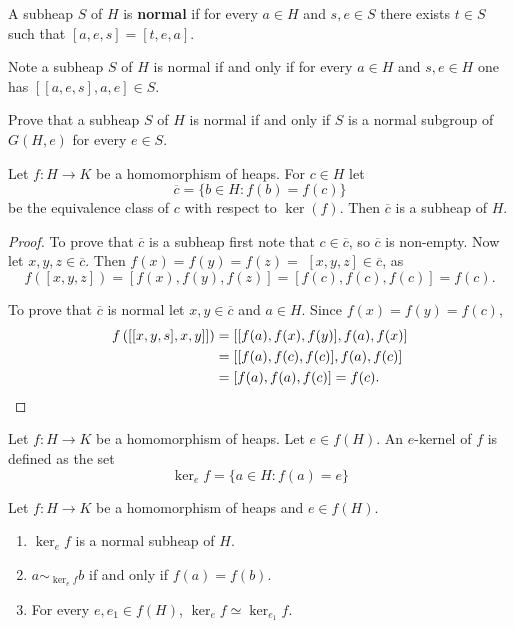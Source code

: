 \documentclass[graybox]{svmult}
\begin{document}
\begin{definition}
    A subheap $S$ of $H$ is \textbf{normal} if 
    for every $a\in H$ and $s,e\in S$ there exists 
    $t\in S$ such that $[a,e,s]=[t,e,a]$.
\end{definition}

Note a subheap $S$ of $H$ is normal if and only if 
    for every $a\in H$ and $s,e\in H$ one has 
    $[[a,e,s],a,e]\in S$.  

\begin{exercise}
    Prove that a subheap $S$ of $H$ is normal if and only if 
    $S$ is a normal subgroup of $G(H,e)$ for every $e\in S$. 
\end{exercise}

\begin{theorem}
    Let $f\colon H\to K$ be a homomorphism of heaps. For $c\in H$
    let 
    \[
    \overline{c}=\{b\in H:f(b)=f(c)\}
    \]
    be the equivalence class of $c$ with respect to $\ker(f)$. 
    Then $\overline{c}$ is a subheap of $H$.  
\end{theorem}

\begin{proof}
    To prove that $\overline{c}$ is a subheap first note that 
    $c\in\overline{c}$, so $\overline{c}$ is non-empty. 
    Now let $x,y,z\in\overline{c}$. 
    Then $f(x)=f(y)=f(z)=$ 
    $[x,y,z]\in\overline{c}$, as
    \[
    f([x,y,z])=[f(x),f(y),f(z)]=[f(c),f(c),f(c)]=f(c).
    \]
    
    To prove that $\overline{c}$ is normal let $x,y\in\overline{c}$ and $a\in H$. 
    Since $f(x)=f(y)=f(c)$, 
    \begin{align*}
        f\left(\left[[x,y,s],x,y]\right]\right)&=\left[[f(a),f(x),f(y)],f(a),f(x)\right]\\ 
        &=\left[[f(a),f(c),f(c)],f(a),f(c)\right]\\
        &=[f(a),f(a),f(c)]=f(c).\qedhere
    \end{align*}
\end{proof}

\begin{definition}
    Let $f\colon H\to K$ be a homomorphism of heaps. Let $e\in f(H)$. 
    An $e$-kernel of $f$ is defined as the set
    \[
    \ker_ef=\{a\in H:f(a)=e\}
    \]
\end{definition}

\begin{theorem}
    Let $f\colon H\to K$ be a homomorphism of heaps and $e\in f(H)$. 
    \begin{enumerate}
        \item $\ker_ef$ is a normal subheap of $H$. 
        \item $a\sim_{\ker_ef}b$ if and only if $f(a)=f(b)$. 
        \item For every $e,e_1\in f(H)$, $\ker_ef\simeq\ker_{e_1}f$. 
    \end{enumerate}
\end{theorem}
\end{document}
